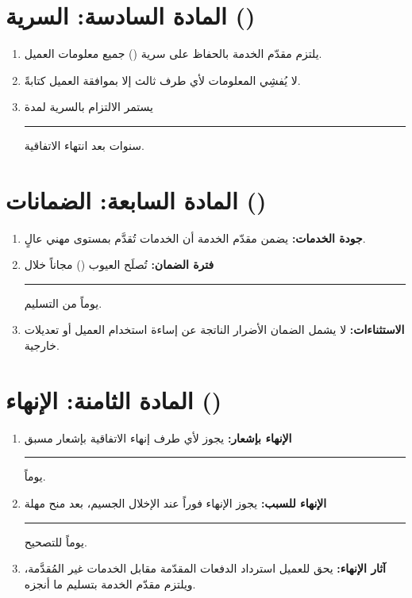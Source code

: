 \documentclass[12pt,a4paper]{article}
\begin{document}
\section{المادة السادسة: السرية ()}
\label{sec:confidentiality}
\begin{enumerate}
    \item يلتزم مقدّم الخدمة بالحفاظ على سرية () جميع معلومات العميل.
    \item لا يُفشِي المعلومات لأي طرف ثالث إلا بموافقة العميل كتابةً.
    \item يستمر الالتزام بالسرية لمدة \rule{2cm}{0.4pt} سنوات بعد انتهاء الاتفاقية.
\end{enumerate}

\section{المادة السابعة: الضمانات ()}
\label{sec:warranties}
\begin{enumerate}
    \item \textbf{جودة الخدمات:} يضمن مقدّم الخدمة أن الخدمات تُقدَّم بمستوى مهني عالٍ.
    \item \textbf{فترة الضمان:} تُصلَح العيوب () مجاناً خلال \rule{2cm}{0.4pt} يوماً من التسليم.
    \item \textbf{الاستثناءات:} لا يشمل الضمان الأضرار الناتجة عن إساءة استخدام العميل أو تعديلات خارجية.
\end{enumerate}

\section{المادة الثامنة: الإنهاء ()}
\label{sec:termination}
\begin{enumerate}
    \item \textbf{الإنهاء بإشعار:} يجوز لأي طرف إنهاء الاتفاقية بإشعار مسبق \rule{2cm}{0.4pt} يوماً.
    \item \textbf{الإنهاء للسبب:} يجوز الإنهاء فوراً عند الإخلال الجسيم، بعد منح مهلة \rule{2cm}{0.4pt} يوماً للتصحيح.
    \item \textbf{آثار الإنهاء:} يحق للعميل استرداد الدفعات المقدّمة مقابل الخدمات غير المُقدَّمة، ويلتزم مقدّم الخدمة بتسليم ما أنجزه.
\end{enumerate}
\end{document}
